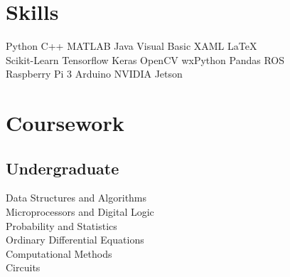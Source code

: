 \documentclass[]{deedy-resume-openfont}
\begin{document}
%
%


%
%

\begin{minipage}[t]{0.33\textwidth} 


\section{Skills}
Python \textbullet{} C++ \textbullet{} MATLAB \textbullet{} Java
\textbullet{} Visual Basic \textbullet{} XAML \textbullet{} \LaTeX\ \\
Scikit-Learn \textbullet{} Tensorflow \textbullet{} Keras \textbullet{} OpenCV \textbullet{} wxPython \textbullet{} Pandas \textbullet{} ROS \\
Raspberry Pi 3 \textbullet{} Arduino \textbullet{} NVIDIA Jetson

\sectionsep


\section{Coursework}
\subsection{Undergraduate}
Data Structures and Algorithms \\
Microprocessors and Digital Logic \\
Probability and Statistics \\
Ordinary Differential Equations \\
Computational Methods \\
Circuits \\
\sectionsep


\end{minipage}
\end{document}
